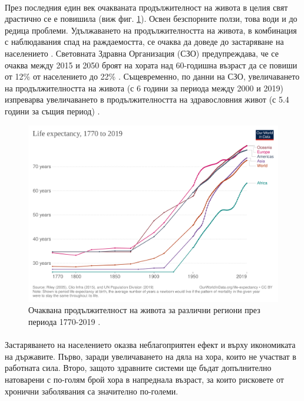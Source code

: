 \documentclass[pdftex,cyrillic,14pt,a4page,twoside,openright]{extreport}
\begin{document}
\paragraph{}
През последния един век очакваната продължителност на живота в целия свят драстично се е повишила \cite{zijdeman2016} (виж фиг. \ref{fig:life_expectancy}). Освен безспорните ползи, това води и до редица проблеми. Удължаването на продължителността на живота, в комбинация с наблюдавания спад на раждаемостта, се очаква да доведе до застаряване на населението \cite{lutz2008}. Световната Здравна Организация (СЗО) предупреждава, че се очаква между 2015 и 2050 броят на хората над 60-годишна възраст да се повиши от 12\% от населението до 22\% \cite{who_report_ageing2015}. Същевременно, по данни на СЗО, увеличаването на продължителността на живота (с 6 години за периода между 2000 и 2019) изпреварва увеличаването в продължителността на здравословния живот (с 5.4 години за същия период) \cite{who_health2020}. \\
\begin{figure}[h]
  \centering
  \includegraphics[width=12cm]{figures/life-expectancy}
  \caption {Очаквана продължителност на живота за различни региони през периода 1770-2019 \cite{zijdeman2016}.}
  \label{fig:life_expectancy}
\end{figure}

\paragraph{}
Застаряването на населението оказва неблагоприятен ефект и върху икономиката на държавите. Първо, заради увеличаването на дяла на хора, които не участват в работната сила. Второ, защото здравните системи ще бъдат допълнително натоварени с по-голям брой хора в напреднала възраст, за които рисковете от хронични заболявания са значително по-големи.
\end{document}
